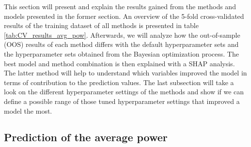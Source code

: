 \documentclass[12pt,a4paper]{article}
\begin{document}
This section will present and explain the results gained from the methods and models presented in the former section. An overview of the 5-fold cross-validated results of the training dataset of all methods is presented in table \ref{tab:CV_results_avg_pow}. Afterwards, we will analyze how the out-of-sample (OOS) results of each method differs with the default hyperparameter sets and the hyperparameter sets obtained from the Bayesian optimization process. The best model and method combination is then explained with a SHAP analysis. The latter method will help to understand which variables improved the model in terms of contribution to the prediction values. The last subsection will take a look on the different hyperparameter settings of the methods and show if we can define a possible range of those tuned hyperparameter settings that improved a model the most.

\hypertarget{prediction-of-the-average-power}{%
\subsection{Prediction of the average power}\label{prediction-of-the-average-power}}
\end{document}
